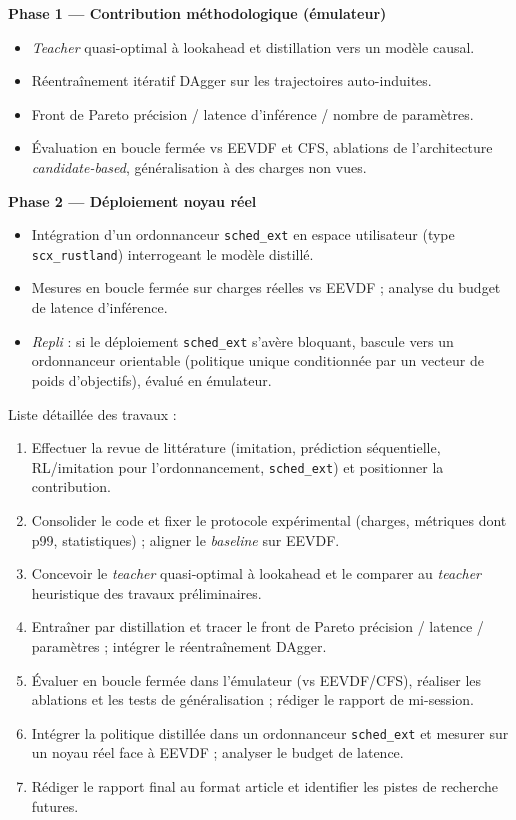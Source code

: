 \documentclass[11pt,a4paper]{article}
\begin{document}
\noindent\textbf{Phase 1 — Contribution méthodologique (émulateur)}
\begin{itemize}[leftmargin=1.5em,itemsep=2pt]
  \item \emph{Teacher} quasi-optimal à lookahead et distillation vers un modèle
    causal.
  \item Réentraînement itératif DAgger sur les trajectoires auto-induites.
  \item Front de Pareto précision / latence d'inférence / nombre de paramètres.
  \item Évaluation en boucle fermée vs EEVDF et CFS, ablations de l'architecture
    \emph{candidate-based}, généralisation à des charges non vues.
\end{itemize}

\noindent\textbf{Phase 2 — Déploiement noyau réel}
\begin{itemize}[leftmargin=1.5em,itemsep=2pt]
  \item Intégration d'un ordonnanceur \texttt{sched\_ext} en espace utilisateur
    (type \texttt{scx\_rustland}) interrogeant le modèle distillé.
  \item Mesures en boucle fermée sur charges réelles vs EEVDF ; analyse du budget
    de latence d'inférence.
  \item \emph{Repli} : si le déploiement \texttt{sched\_ext} s'avère bloquant,
    bascule vers un ordonnanceur \og orientable \fg{} (politique unique
    conditionnée par un vecteur de poids d'objectifs), évalué en émulateur.
\end{itemize}

\medskip
\noindent Liste détaillée des travaux :
\begin{enumerate}[leftmargin=1.6em,itemsep=3pt]
  \item Effectuer la revue de littérature (imitation, prédiction séquentielle,
    RL/imitation pour l'ordonnancement, \texttt{sched\_ext}) et positionner la
    contribution.
  \item Consolider le code et fixer le protocole expérimental (charges,
    métriques dont p99, statistiques) ; aligner le \emph{baseline} sur EEVDF.
  \item Concevoir le \emph{teacher} quasi-optimal à lookahead et le comparer au
    \emph{teacher} heuristique des travaux préliminaires.
  \item Entraîner par distillation et tracer le front de Pareto précision /
    latence / paramètres ; intégrer le réentraînement DAgger.
  \item Évaluer en boucle fermée dans l'émulateur (vs EEVDF/CFS), réaliser les
    ablations et les tests de généralisation ; rédiger le rapport de mi-session.
  \item Intégrer la politique distillée dans un ordonnanceur \texttt{sched\_ext}
    et mesurer sur un noyau réel face à EEVDF ; analyser le budget de latence.
  \item Rédiger le rapport final au format article et identifier les pistes de
    recherche futures.
\end{enumerate}
\end{document}
